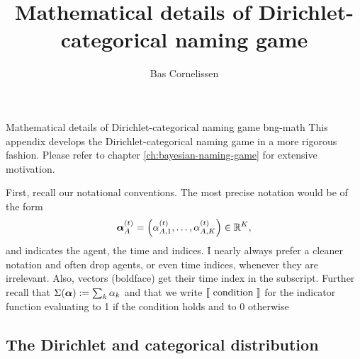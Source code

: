 \documentclass{../src/bcthesispart}
\title{Mathematical details of Dirichlet-categorical naming game}
\author{Bas Cornelissen}
\begin{document}
%
	{Mathematical details of Dirichlet-categorical naming game}%
	{bng-math}{%
	This appendix develops the Dirichlet-categorical naming game in a more rigorous fashion. Please refer to chapter \ref{ch:bayesian-naming-game} for extensive motivation.
	}

	
	
\noindent
First, recall our notational conventions.
The most precise notation would be of the form
\begin{align}
	\boldsymbol{\mathbf{\alpha}}_A^{(t)} 
		= \Bigl(\alpha_{A,1}^{(t)}, \dots, \alpha_{A, K}^{(t)}\Bigr) 
		\in\mathbb{R}^K,
\end{align}
and indicates the agent, the time and indices. I nearly always prefer a cleaner notation and often drop agents, or even time indices, whenever they are irrelevant.
Also, vectors (boldface) get their time index in the subscript.
Further recall that $\Sigma(\boldsymbol{\mathbf{\alpha}}) := \sum_k \alpha_k$ and that we write $\left\llbracket \text{ condition }\right\rrbracket$ for the indicator function evaluating to 1 if the condition holds and to 0 otherwise




\subsection{The Dirichlet and categorical distribution}
\end{document}
